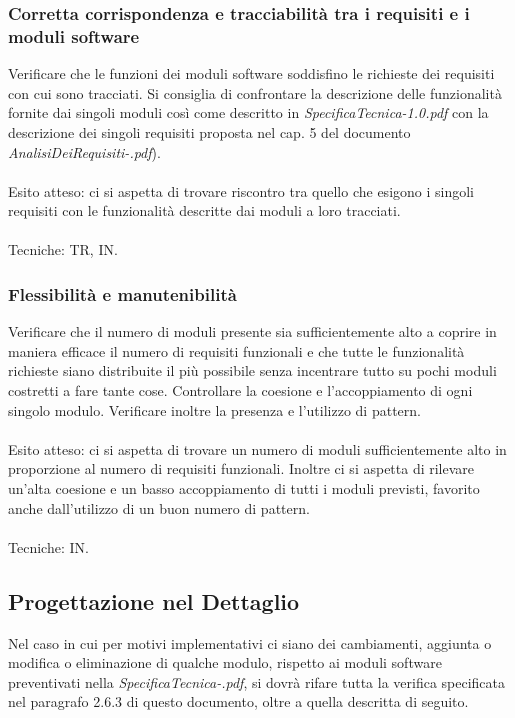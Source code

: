 \subsubsection*{Corretta corrispondenza e tracciabilit\`a tra i requisiti e i
moduli software}

Verificare che le funzioni dei moduli software soddisfino le richieste dei
requisiti con cui sono tracciati. Si consiglia di confrontare la descrizione
delle funzionalit\`a fornite dai singoli moduli cos\`i come descritto in
\emph{SpecificaTecnica-1.0.pdf} con la descrizione dei singoli requisiti
proposta nel cap. 5 del documento \emph{AnalisiDeiRequisiti-\versioneAR.pdf}).
\\\\
Esito atteso: ci si aspetta di trovare riscontro tra quello che esigono i
singoli requisiti con le funzionalit\`a descritte dai moduli a loro tracciati.
\\\\
Tecniche: TR, IN.


\subsubsection*{Flessibilit\`a e manutenibilit\`a}

Verificare che il numero di moduli presente sia sufficientemente alto a coprire
in maniera efficace il numero di requisiti funzionali e che tutte le
funzionalit\`a richieste siano distribuite il pi\`u possibile senza incentrare
tutto su pochi moduli costretti a fare tante cose. Controllare la coesione e
l'accoppiamento di ogni singolo modulo. Verificare inoltre la presenza e
l'utilizzo di pattern.
\\\\
Esito atteso: ci si aspetta di trovare un numero di moduli sufficientemente alto
in proporzione al numero di requisiti funzionali. Inoltre ci si aspetta di
rilevare un'alta coesione e un basso accoppiamento di tutti i moduli previsti,
favorito anche dall'utilizzo di un buon numero di pattern. 
\\\\
Tecniche: IN.


\subsection{Progettazione nel Dettaglio}
Nel caso in cui per motivi implementativi ci siano dei
cambiamenti, aggiunta o modifica o eliminazione di qualche modulo, rispetto ai
moduli software preventivati nella \emph{SpecificaTecnica-\versioneST.pdf}, si
dovr\`a rifare tutta la verifica specificata nel paragrafo 2.6.3 di questo
documento, oltre a quella descritta di seguito. 
